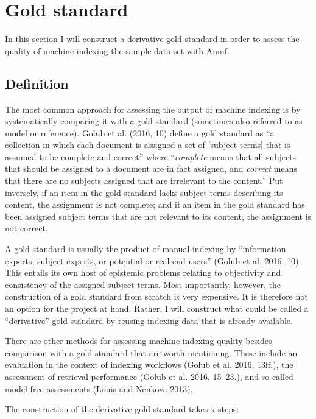 \hypertarget{gold-standard}{%
\section{Gold standard}\label{gold-standard}}

In this section I will construct a derivative gold standard in order to
assess the quality of machine indexing the sample data set with Annif.

\hypertarget{definition}{%
\subsection{Definition}\label{definition}}

The most common approach for assessing the output of machine indexing is
by systematically comparing it with a gold standard (sometimes also
referred to as model or reference). Golub et al. (2016, 10) define a
gold standard as ``a collection in which each document is assigned a set
of {[}subject terms{]} that is assumed to be complete and correct''
where ``\emph{complete} means that all subjects that should be assigned
to a document are in fact assigned, and \emph{correct} means that there
are no subjects assigned that are irrelevant to the content.'' Put
inversely, if an item in the gold standard lacks subject terms
describing its content, the assignment is not complete; and if an item
in the gold standard has been assigned subject terms that are not
relevant to its content, the assignment is not correct.

A gold standard is usually the product of manual indexing by
``information experts, subject experts, or potential or real end users''
(Golub et al. 2016, 10). This entails its own host of epistemic problems
relating to objectivity and consistency of the assigned subject terms.
Most importantly, however, the construction of a gold standard from
scratch is very expensive. It is therefore not an option for the project
at hand. Rather, I will construct what could be called a ``derivative''
gold standard by reusing indexing data that is already available.

There are other methods for assessing machine indexing quality besides
comparison with a gold standard that are worth mentioning. These include
an evaluation in the context of indexing workflows (Golub et al. 2016,
13ff.), the assessment of retrieval performance (Golub et al. 2016,
15--23.), and so-called model free assessments (Louis and Nenkova 2013).

The construction of the derivative gold standard takes x steps:

